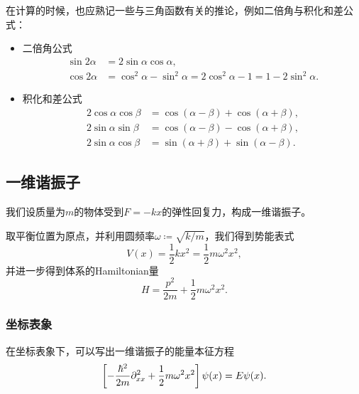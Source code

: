 在计算的时候，也应熟记一些与三角函数有关的推论，例如二倍角与积化和差公式：
\begin{itemize}
    \item 二倍角公式
    \begin{equation}
    \begin{aligned}
        \sin 2\alpha &= 2\sin\alpha\cos\alpha, \\
        \cos 2\alpha &= \cos^2\alpha - \sin^2\alpha = 2\cos^2\alpha - 1 = 1 - 2\sin^2\alpha.
    \end{aligned}
    \end{equation}
    \item 积化和差公式
    \begin{equation}
    \begin{aligned}
        2\cos\alpha\cos\beta &= \cos(\alpha-\beta) + \cos(\alpha+\beta), \\
        2\sin\alpha\sin\beta &= \cos(\alpha-\beta) - \cos(\alpha+\beta), \\
        2\sin\alpha\cos\beta &= \sin(\alpha+\beta) + \sin(\alpha-\beta).
    \end{aligned}
    \end{equation}
\end{itemize}


\subsection{一维谐振子}
\label{subsec:onedim_osc}

我们设质量为$m$的物体受到$F=-kx$的弹性回复力，构成一维谐振子。

取平衡位置为原点，并利用圆频率$\omega\coloneq\sqrt{k/m}$，我们得到势能表式
\begin{equation}
    V(x) = \frac12 kx^2 = \frac12 m\omega^2 x^2,
\end{equation}
并进一步得到体系的Hamiltonian量
\begin{equation}
    \label{eq:onedim_osc_ham}
    H = \frac{p^2}{2m} + \frac12 m\omega^2 x^2.
\end{equation}

\subsubsection{坐标表象}

在坐标表象下，可以写出一维谐振子的能量本征方程
\begin{equation}
    \left[ -\frac{\hbar^2}{2m}\partial_{xx}^2 + \frac12 m\omega^2 x^2 \right] \psi(x) = E\psi(x).
\end{equation}

